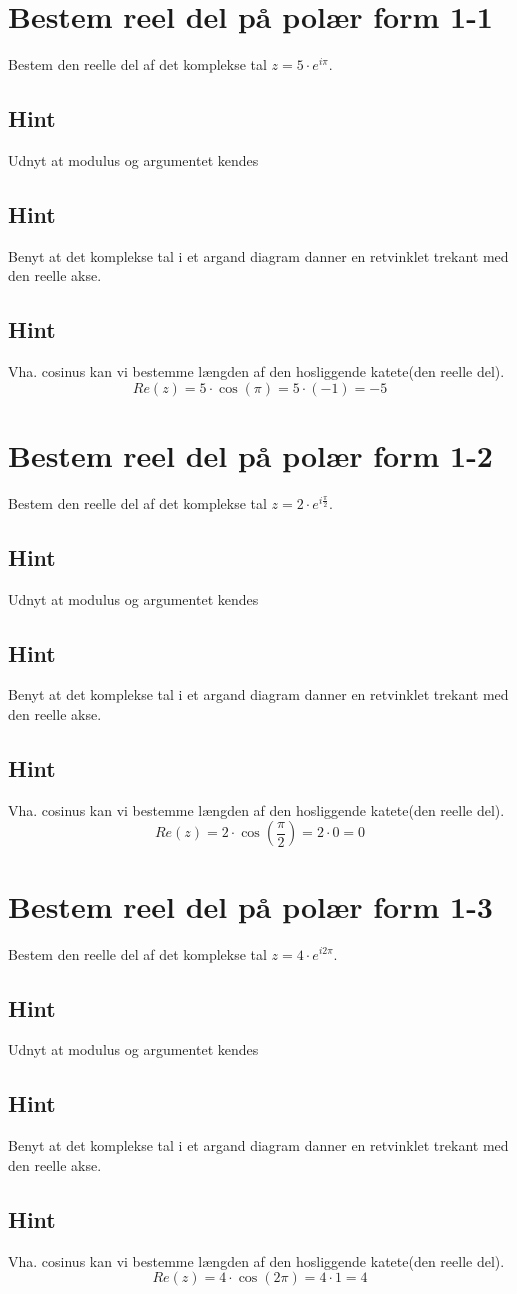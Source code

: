 \documentclass{article}
\newenvironment{exercise}[1]{\newpage\section{#1}}{}
\newcommand{\answerbox}[1]{\fbox{$#1$}}
\newcommand{\hint}{\subsection*{Hint}}
\begin{document}
\tableofcontents
\newpage

\begin{exercise}{Bestem reel del på polær form 1-1}

Bestem den reelle del af det komplekse tal $z=5 \cdot e^{i \pi}$.

\answerbox{-5}


\hint 

Udnyt at modulus og argumentet kendes


\hint

Benyt at det komplekse tal i et argand diagram danner en retvinklet trekant med den reelle akse. 

\hint 

Vha. cosinus kan vi bestemme længden af den hosliggende katete(den reelle del).
\[
Re(z) =  5 \cdot \cos(\pi) = 5 \cdot (-1) = -5 
\]

\end{exercise}

\newpage

\begin{exercise}{Bestem reel del på polær form 1-2}
	
	Bestem den reelle del af det komplekse tal $z=2 \cdot e^{i \frac{\pi}{2}}$.
	
	\answerbox{0}
	
	
	\hint 
	
	Udnyt at modulus og argumentet kendes
	
	
	\hint
	
	Benyt at det komplekse tal i et argand diagram danner en retvinklet trekant med den reelle akse. 
	
	\hint 
	
	Vha. cosinus kan vi bestemme længden af den hosliggende katete(den reelle del).
	\[
	Re(z) =  2 \cdot \cos\left(\frac{\pi}{2}\right) = 2 \cdot 0 = 0
	\]
	
\end{exercise}

\newpage

\begin{exercise}{Bestem reel del på polær form 1-3}
	
	Bestem den reelle del af det komplekse tal $z=4 \cdot e^{i 2\pi}$.
	
	\answerbox{4}
	
	
	\hint 
	
	Udnyt at modulus og argumentet kendes
	
	
	\hint
	
	Benyt at det komplekse tal i et argand diagram danner en retvinklet trekant med den reelle akse. 
	
	\hint 
	
	Vha. cosinus kan vi bestemme længden af den hosliggende katete(den reelle del).
	\[
	Re(z) =  4 \cdot \cos(2\pi) = 4 \cdot 1 = 4
	\]
	
\end{exercise}
\end{document}
